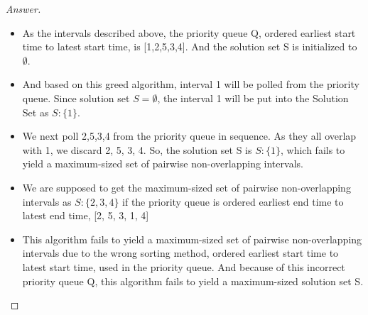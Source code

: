 \documentclass[11pt]{article}
\theoremstyle{definition}
\theoremstyle{definition}
\theoremstyle{definition}
\newcommand{\interval}[4]{\draw (#2, #1) -- (#3, #1); %
\draw (#2, #1-0.11) -- (#2, #1+0.11); %
\draw (#3, #1-0.11) -- (#3, #1+0.11); %
\node[] at (#2-0.25, #1) {#4};
}
\begin{document}
\begin{proof}[Answer]
\\

\begin{itemize}
\item As the intervals described above, the priority queue Q, ordered earliest start time to latest start time, is [1,2,5,3,4]. And the solution set S is initialized to $\emptyset$.
\item And based on this greed algorithm, interval 1 will be polled from the priority queue. Since solution set $S = \emptyset$, the interval 1 will be put into the Solution Set as $S: \{1 \} $.
\item We next poll 2,5,3,4 from the priority queue in sequence. As they all overlap with 1, we discard 2, 5, 3, 4. So, the solution set S is $S: \{1 \} $, which fails to yield a maximum-sized set of pairwise non-overlapping intervals.
\item We are supposed to get the maximum-sized set of pairwise non-overlapping intervals as $S: \{2,3,4 \} $ if the priority queue is ordered earliest end time to latest end time, [2, 5, 3, 1, 4]
\item This algorithm fails to yield a maximum-sized set of pairwise non-overlapping intervals due to the wrong sorting method, ordered earliest start time to latest start time, used in the priority queue. And because of this incorrect priority queue Q, this algorithm fails to yield a maximum-sized solution set S.
\end{itemize}

\end{proof}






\newpage
\end{document}
